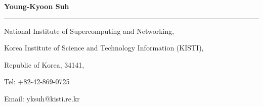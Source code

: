 \documentclass{letter} %
\begin{document}
\signature{Young-Kyoon Suh}           %
\longindentation=0pt                       %
\let\raggedleft\raggedright                %
 
\begin{letter}{
%
}

\begin{flushleft}
{\large\bf Young-Kyoon Suh}
\end{flushleft}
\medskip\hrule height 1pt
\begin{flushright}
\hfill National Institute of Supercomputing and Networking, 
\end{flushright}
\vspace{-.15in}
\begin{flushright}
\hfill Korea Institute of Science and Technology Information (KISTI), 
\end{flushright}
\vspace{-.15in}
\begin{flushright}
\hfill Republic of Korea, 34141, 
\end{flushright}
\vspace{-.15in}
\begin{flushright}
\hfill Tel: +82-42-869-0725
\end{flushright}
\vspace{-.15in}
\begin{flushright}
\hfill Email: yksuh@kisti.re.kr
\end{flushright} 


\end{letter}
\end{document}
